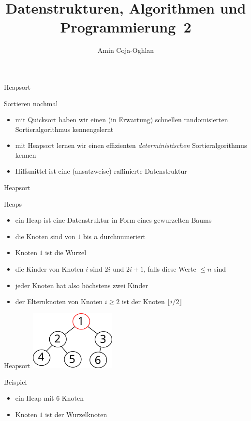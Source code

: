 \documentclass[aspectratio=1610, 11pt]{beamer}
\title{Datenstrukturen, Algorithmen und Programmierung~2}
\author[A.~Coja-Oghlan]{Amin Coja-Oghlan}
\institute[DAP2]{Lehrstuhl Informatik 2\\Fakult\"at f\"ur Informatik}
\begin{document}
\maketitle

\begin{frame}{Heapsort}
	\begin{exampleblock}{Sortieren nochmal}
		\begin{itemize}
			\item mit Quicksort haben wir einen (in Erwartung) schnellen randomisierten Sortieralgorithmus kennengelernt
			\item mit Heapsort lernen wir einen effizienten \emph{deterministischen} Sortieralgorithmus kennen
			\item Hilfsmittel ist eine (ansatzweise) raffinierte Datenstruktur
		\end{itemize}
	\end{exampleblock}
\end{frame}

\begin{frame}{Heapsort}
	\begin{exampleblock}{Heaps}
		\begin{itemize}
			\item ein Heap ist eine Datenstruktur in Form eines gewurzelten Baums
			\item die Knoten sind von $1$ bis $n$ durchnumeriert
			\item Knoten $1$ ist die Wurzel
			\item die Kinder von Knoten $i$ sind $2i$ und $2i+1$, falls diese Werte $\leq n$ sind
			\item jeder Knoten hat also h\"ochstens zwei Kinder
			\item der Elternknoten von Knoten $i\geq2$ ist der Knoten $\lfloor i/2\rfloor$
		\end{itemize}
	\end{exampleblock}
\end{frame}

\begin{frame}{Heapsort}
	\hfill\includegraphics[height=30mm]{./images/heap.pdf}
	\begin{exampleblock}{Beispiel}
		\begin{itemize}
			\item ein Heap mit 6 Knoten
			\item Knoten $1$ ist der Wurzelknoten
		\end{itemize}
	\end{exampleblock}
\end{frame}
\end{document}
